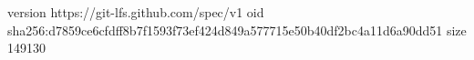 version https://git-lfs.github.com/spec/v1
oid sha256:d7859ce6cfdff8b7f1593f73ef424d849a577715e50b40df2bc4a11d6a90dd51
size 149130
